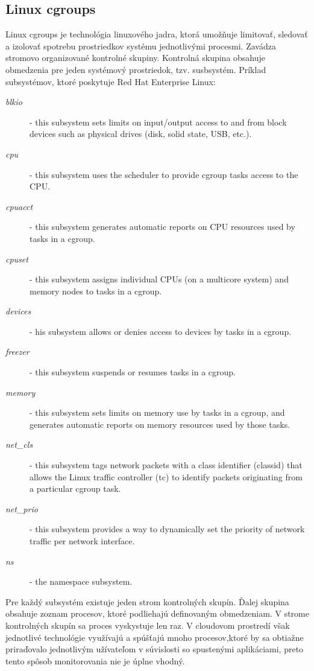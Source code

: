 \documentclass[11pt,final,oneside]{fithesis}
\begin{document}
\subsection{Linux cgroups}
Linux cgroups je technológia linuxového jadra, ktorá umožňuje limitovať, sledovať a izolovať spotrebu prostriedkov systému jednotlivými procesmi. Zavádza stromovo organizované kontrolné skupiny. 
Kontrolná skupina obsahuje obmedzenia pre jeden systémový prostriedok, tzv. susbsystém. Príklad subsystémov, ktoré poskytuje Red Hat Enterprise Linux: 
\begin{description}
\item[\emph{blkio}] - this subsystem sets limits on input/output access to and from block devices such as physical drives (disk, solid state, USB, etc.).
\item[\emph{cpu}] - this subsystem uses the scheduler to provide cgroup tasks access to the CPU.
\item[\emph{cpuacct}] - this subsystem generates automatic reports on CPU resources used by tasks in a cgroup.
\item[\emph{cpuset}] - this subsystem assigns individual CPUs (on a multicore system) and memory nodes to tasks in a cgroup.
\item[\emph{devices}] - his subsystem allows or denies access to devices by tasks in a cgroup.
\item[\emph{freezer}] - this subsystem suspends or resumes tasks in a cgroup.
\item[\emph{memory}] - this subsystem sets limits on memory use by tasks in a cgroup, and generates automatic reports on memory resources used by those tasks.
\item[\emph{net\_cls}] - this subsystem tags network packets with a class identifier (classid) that allows the Linux traffic controller (tc) to identify packets originating from a particular cgroup task.
\item[\emph{net\_prio}] - this subsystem provides a way to dynamically set the priority of network traffic per network interface.
\item[\emph{ns}] - the namespace subsystem.
\end{description}

Pre každý subsystém existuje jeden strom kontrolných skupín. Ďalej skupina obsahuje zoznam procesov, ktoré podliehajú definovaným obmedzeniam. V strome kontrolných skupín sa proces vyskystuje len raz.
V cloudovom prostredí však jednotlivé technológie využívajú a spúšťajú mnoho procesov,ktoré by sa obtiažne priraďovalo jednotlivým užívateľom v súvislosti so spustenými aplikáciami, preto tento spôsob
monitorovania nie je úplne vhodný.
\end{document}
